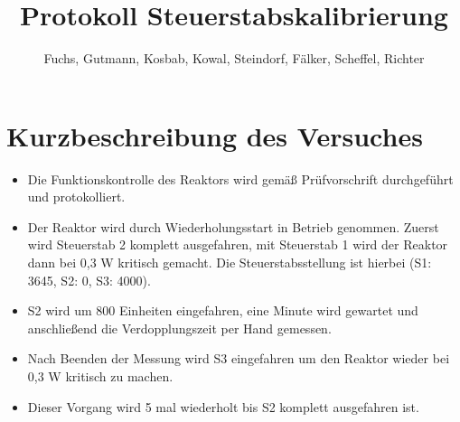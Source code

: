 \documentclass[12pt,german]{article}
\title{\vspace{-1cm}Protokoll Steuerstabskalibrierung}
\author{Fuchs, Gutmann, Kosbab, Kowal, Steindorf, Fälker, Scheffel, Richter}
\begin{document}
    \maketitle
    \tableofcontents

    \section{Kurzbeschreibung des Versuches}
    \begin{itemize}
        \item Die Funktionskontrolle des Reaktors wird gemäß Prüfvorschrift durchgeführt und protokolliert.
        \item Der Reaktor wird durch Wiederholungsstart in Betrieb genommen. Zuerst wird Steuerstab 2 komplett ausgefahren, mit Steuerstab 1 wird der Reaktor dann bei 0,3 W kritisch gemacht.
              Die Steuerstabsstellung ist hierbei (S1: 3645, S2: 0, S3: 4000).
        \item S2 wird um 800 Einheiten eingefahren, eine Minute wird gewartet und anschließend die Verdopplungszeit per Hand gemessen.
        \item Nach Beenden der Messung wird S3 eingefahren um den Reaktor wieder bei 0,3 W kritisch zu machen.
        \item Dieser Vorgang wird 5 mal wiederholt bis S2 komplett ausgefahren ist.
    \end{itemize}

    \newpage
\end{document}
